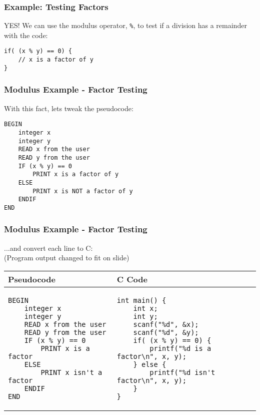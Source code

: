 \documentclass[14pt]{beamer}
\begin{document}
\begin{frame}[fragile]
\frametitle{Example: Testing Factors}
YES! We can use the modulus operator, \texttt{\%}, to test if a division has a remainder with the code:

\begin{lstlisting}[style=CStyle]
if( (x % y) == 0) {
	// x is a factor of y
}
\end{lstlisting}

\end{frame}

\begin{frame}[fragile]
\frametitle{Modulus Example - Factor Testing}
With this fact, lets tweak the pseudocode:
\begin{lstlisting}[style=pseudo]
BEGIN
	integer x
	integer y
	READ x from the user
	READ y from the user
	IF (x % y) == 0
		PRINT x is a factor of y
	ELSE
		PRINT x is NOT a factor of y
	ENDIF
END
\end{lstlisting}
\end{frame}

\begin{frame}[fragile]
\frametitle{Modulus Example - Factor Testing}
...and convert each line to C:\\
\vspace{4mm}
(Program output changed to fit on slide)
\vspace{-2mm}
\begin{table}[H]
\centering

\begin{tabular}{ll}
Pseudocode & C Code \\
\hline

\begin{lstlisting}[style=pseudo,basicstyle=\ttfamily\scriptsize]
BEGIN
	integer x
	integer y
	READ x from the user
	READ y from the user
	IF (x % y) == 0
		PRINT x is a factor
	ELSE
		PRINT x isn't a factor
	ENDIF
END
\end{lstlisting} &

\begin{lstlisting}[style=Ctable,basicstyle=\ttfamily\scriptsize]
int main() {
	int x;
	int y;
	scanf("%d", &x);
	scanf("%d", &y);
	if( (x % y) == 0) {
		printf("%d is a factor\n", x, y);
	} else {
		printf("%d isn't factor\n", x, y);
	}
}
\end{lstlisting}
\\

\hline
\end{tabular}
\end{table}

\end{frame}
\end{document}
